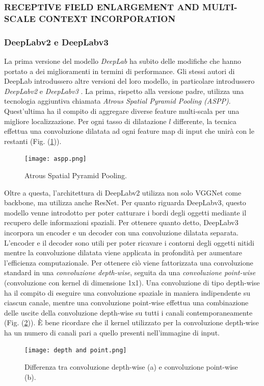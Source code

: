 \subsubsection{RECEPTIVE FIELD ENLARGEMENT AND MULTI-SCALE CONTEXT INCORPORATION}
\subsubsection{DeepLabv2 e DeepLabv3}
La prima versione del modello \emph{DeepLab} ha subito delle modifiche che hanno 
portato a dei miglioramenti in termini di performance. Gli stessi autori di 
DeepLab introdussero altre versioni del loro modello, in particolare introdussero 
\emph{DeepLabv2} \cite{deeplabv2} e \emph{DeepLabv3} \cite{deeplabv3}. La prima, rispetto alla versione padre, utilizza 
una tecnologia aggiuntiva chiamata \emph{Atrous Spatial Pyramid Pooling (ASPP)}.  
Quest'ultima ha il compito di aggregare diverse feature multi-scala per una 
migliore localizzazione. Per ogni tasso di dilatazione $l$ differente, la tecnica 
effettua una convoluzione dilatata ad ogni feature map di input che unirà con le 
restanti (Fig. (\ref{aspp})).
\begin{figure}
    \centering
    \texttt{[image: aspp.png]}
    \centering
    \caption{Atrous Spatial Pyramid Pooling.}
    \label{aspp}
\end{figure}
Oltre a questa, l'architettura di DeepLabv2 utilizza non solo VGGNet come 
backbone, ma utilizza anche ResNet. Per quanto riguarda DeepLabv3, questo 
modello venne introdotto per poter catturare i bordi degli oggetti mediante il 
recupero delle informazioni spaziali. Per ottenere quanto detto, DeepLabv3 incorpora 
un encoder e un decoder con una convoluzione dilatata separata. L'encoder 
e il decoder sono utili per poter ricavare i contorni degli oggetti nitidi mentre 
la convoluzione dilatata viene applicata in profondità per aumentare l'efficienza 
computazionale. Per ottenere ciò viene fattorizzata una convoluzione standard in 
una \emph{convoluzione depth-wise}, seguita da una \emph{convoluzione point-wise} (convoluzione 
con kernel di dimensione 1x1). Una convoluzione di tipo depth-wise ha il compito 
di eseguire una convoluzione spaziale in maniera indipendente su ciascun canale, 
mentre una convoluzione point-wise effettua una combinazione delle uscite della 
convoluzione depth-wise su tutti i canali contemporaneamente (Fig. (\ref{depth and point})). È bene ricordare 
che il kernel utilizzato per la convoluzione depth-wise ha un numero di canali pari 
a quello presenti nell'immagine di input.
\begin{figure}
    \centering
    \texttt{[image: depth and point.png]}
    \centering
    \caption{Differenza tra convoluzione depth-wise (a) e convoluzione point-wise (b).}
    \label{depth and point}
\end{figure}

